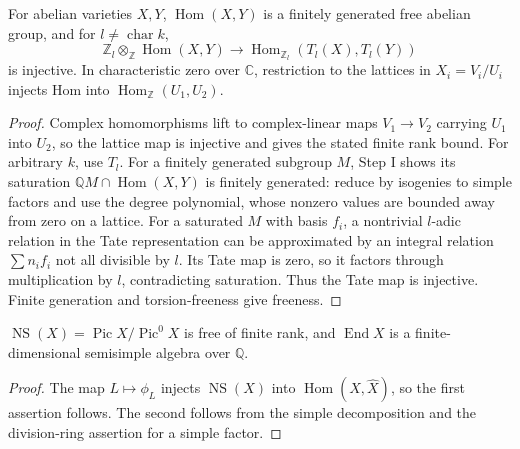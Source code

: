 \begin{theorem}
\label{mumford-thm-hom-tate-injective}
For abelian varieties $X,Y$, $\operatorname{Hom}(X,Y)$ is a finitely
generated free abelian group, and for $l\ne\operatorname{char}k$,
\[
\mathbb Z_l\otimes_\mathbb Z\operatorname{Hom}(X,Y)\longrightarrow
\operatorname{Hom}_{\mathbb Z_l}(T_l(X),T_l(Y))
\]
is injective. In characteristic zero over $\mathbb C$, restriction to the
lattices in $X_i=V_i/U_i$ injects Hom into
$\operatorname{Hom}_{\mathbb Z}(U_1,U_2)$.
\end{theorem}
\begin{proof}
Complex homomorphisms lift to complex-linear maps $V_1\to V_2$ carrying
$U_1$ into $U_2$, so the lattice map is injective and gives the stated
finite rank bound. For arbitrary $k$, use $T_l$. For a finitely generated
subgroup $M$, Step I shows its saturation
$\mathbb QM\cap\operatorname{Hom}(X,Y)$ is finitely generated: reduce by
isogenies to simple factors and use the degree polynomial, whose nonzero
values are bounded away from zero on a lattice. For a saturated $M$ with
basis $f_i$, a nontrivial $l$-adic relation in the Tate representation can
be approximated by an integral relation $\sum n_if_i$ not all divisible by
$l$. Its Tate map is zero, so it factors through multiplication by $l$,
contradicting saturation. Thus the Tate map is injective. Finite generation
and torsion-freeness give freeness.
\end{proof}

\begin{corollary}
\label{mumford-cor-ns-finite-free}
$\operatorname{NS}(X)=\operatorname{Pic}X/\operatorname{Pic}^0X$ is free of
finite rank, and $\operatorname{End}X$ is a finite-dimensional semisimple
algebra over $\mathbb Q$.
\end{corollary}
\begin{proof}
The map $L\mapsto\phi_L$ injects $\operatorname{NS}(X)$ into
$\operatorname{Hom}(X,\widehat X)$, so the first assertion follows. The
second follows from the simple decomposition and the division-ring assertion
for a simple factor.
\end{proof}

